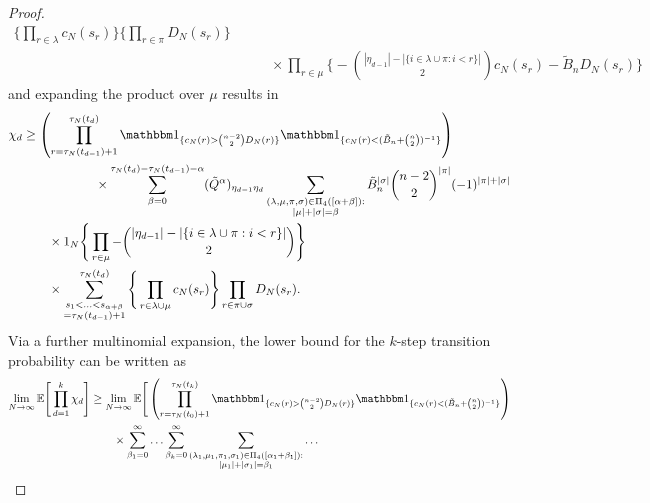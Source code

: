 \begin{proof}
\begin{align*}
        \Bigg\{ \prod_{ r \in \lambda } c_N( s_r ) \Bigg\} 
        \Bigg\{ \prod_{ r \in \pi }  D_N( s_r ) \Bigg\} \\
    &\qquad \times \prod_{ r \in \mu } \Bigg\{ - 
        \binom{ | \eta_{ d - 1 } | - | \{ i \in \lambda \cup \pi : i < r \} | }{ 2 } c_N( s_r ) 
        - \tilde{B}_n D_N( s_r ) \Bigg\}
\end{align*}
and expanding the product over $\mu$ results in
\begin{align*}
\chi_d 
&\geq \left( \prod_{r=\tau_N(t_{d-1})+1}^{\tau_N(t_d)}
        \I{ c_N(r) > \binom{n-2}{2} D_N(r) } 
        \I{ c_N(r) < (\tilde{B}_n + \binom{n}{2})^{-1} } \right) \\
    &\hspace{2cm}\times \sum_{ \beta = 0 }
        ^{ \tau_N( t_d ) - \tau_N( t_{ d - 1 } ) - \alpha } 
        ( \tilde{ Q }^{ \alpha } )_{ \eta_{ d - 1 } \eta_d } 
        \sum_{\substack{ ( \lambda, \mu, \pi, \sigma ) \in \Pi_4( [ \alpha + \beta ] ) :
        \\ | \mu | + | \sigma | = \beta }} \tilde{B}_n^{ | \sigma | } 
        \binom{ n - 2 }{ 2 }^{ | \pi | } ( -1 )^{ | \pi | + | \sigma | } \\
    &\qquad \times \ON %
        \Bigg\{ \prod_{ r \in \mu } - 
        \binom{ | \eta_{ d - 1 } | - | \{ i \in \lambda \cup \pi : i < r \} | }{ 2 } \Bigg\} \\
    &\qquad \times \sum_{\substack{ s_1 < \ldots < s_{ \alpha + \beta } 
        \\ = \tau_N( t_{ d - 1 } ) + 1 }}^{ \tau_N( t_d ) } 
        \Bigg\{ \prod_{ r \in \lambda \cup \mu } c_N( s_r ) \Bigg\} 
        \prod_{ r \in \pi \cup \sigma }  D_N( s_r ) .
\end{align*}
Via a further multinomial expansion, the lower bound for the $k$-step transition probability can be written as
\begin{align*}
\lim_{ N \rightarrow \infty } \E\Bigg[ \prod_{ d = 1 }^k \chi_d \Bigg]
&\geq \lim_{ N \rightarrow \infty } 
        \E\Bigg[ \left( \prod_{r=\tau_N(t_0)+1}^{\tau_N(t_k)}
        \I{ c_N(r) > \binom{n-2}{2} D_N(r) } 
        \I{ c_N(r) < (\tilde{B}_n + \binom{n}{2})^{-1} } \right) \\
    &\qquad\times\sum_{ \beta_1 = 0 }^{ \infty } \ldots \sum_{ \beta_k = 0 }^{ \infty }         
        \sum_{\substack{ ( \lambda_1, \mu_1, \pi_1, \sigma_1 ) 
        \in \Pi_4( [ \alpha_1 + \beta_1 ] ):\\  | \mu_1 | + | \sigma_1 | = \beta_1 }}
        \ldots 

\end{align*}
\end{proof}
